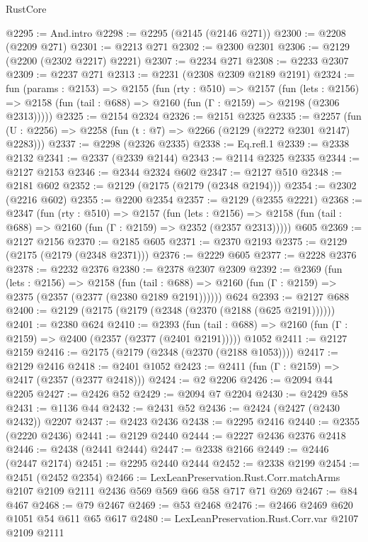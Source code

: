 \begin{lexlean}{RustCore}
\begin{coremodule}
@2295 := And.intro
@2298 := @2295 (@2145 (@2146 @271))
@2300 := @2208 (@2209 @271)
@2301 := @2213 @271
@2302 := @2300 @2301
@2306 := @2129 (@2200 (@2302 @2217) @2221)
@2307 := @2234 @271
@2308 := @2233 @2307
@2309 := @2237 @271
@2313 := @2231 (@2308 @2309 @2189 @2191)
@2324 := fun (params : @2153) =>
  @2155
    (fun (rty : @510) =>
    @2157
      (fun (lets : @2156) =>
      @2158 (fun (tail : @688) => @2160 (fun (Γ : @2159) => @2198 (@2306 @2313)))))
@2325 := @2154 @2324
@2326 := @2151 @2325
@2335 := @2257 (fun (U : @2256) => @2258 (fun (t : @7) => @2266 (@2129 (@2272 @2301 @2147) @2283)))
@2337 := @2298 (@2326 @2335)
@2338 := Eq.refl.{1}
@2339 := @2338 @2132
@2341 := @2337 (@2339 @2144)
@2343 := @2114 @2325 @2335
@2344 := @2127 @2153
@2346 := @2344 @2324 @602
@2347 := @2127 @510
@2348 := @2181 @602
@2352 := @2129 (@2175 (@2179 (@2348 @2194)))
@2354 := @2302 (@2216 @602)
@2355 := @2200 @2354
@2357 := @2129 (@2355 @2221)
@2368 := @2347
    (fun (rty : @510) =>
    @2157
      (fun (lets : @2156) =>
      @2158 (fun (tail : @688) => @2160 (fun (Γ : @2159) => @2352 (@2357 @2313)))))
    @605
@2369 := @2127 @2156
@2370 := @2185 @605
@2371 := @2370 @2193
@2375 := @2129 (@2175 (@2179 (@2348 @2371)))
@2376 := @2229 @605
@2377 := @2228 @2376
@2378 := @2232 @2376
@2380 := @2378 @2307 @2309
@2392 := @2369
    (fun (lets : @2156) =>
    @2158
      (fun (tail : @688) => @2160 (fun (Γ : @2159) => @2375 (@2357 (@2377 (@2380 @2189 @2191))))))
    @624
@2393 := @2127 @688
@2400 := @2129 (@2175 (@2179 (@2348 (@2370 (@2188 (@625 @2191))))))
@2401 := @2380 @624
@2410 := @2393
    (fun (tail : @688) => @2160 (fun (Γ : @2159) => @2400 (@2357 (@2377 (@2401 @2191)))))
    @1052
@2411 := @2127 @2159
@2416 := @2175 (@2179 (@2348 (@2370 (@2188 @1053))))
@2417 := @2129 @2416
@2418 := @2401 @1052
@2423 := @2411 (fun (Γ : @2159) => @2417 (@2357 (@2377 @2418)))
@2424 := @2 @2206
@2426 := @2094 @44 @2205
@2427 := @2426 @52
@2429 := @2094 @7 @2204
@2430 := @2429 @58
@2431 := @1136 @44
@2432 := @2431 @52
@2436 := @2424 (@2427 (@2430 @2432)) @2207
@2437 := @2423 @2436
@2438 := @2295 @2416
@2440 := @2355 (@2220 @2436)
@2441 := @2129 @2440
@2444 := @2227 @2436 @2376 @2418
@2446 := @2438 (@2441 @2444)
@2447 := @2338 @2166
@2449 := @2446 (@2447 @2174)
@2451 := @2295 @2440 @2444
@2452 := @2338 @2199
@2454 := @2451 (@2452 @2354)
@2466 := LexLeanPreservation.Rust.Corr.matchArms
    @2107
    @2109
    @2111
    @2436
    @569
    @569
    @66
    @58
    @717
    @71
    @269
@2467 := @84 @467
@2468 := @79 @2467
@2469 := @53 @2468
@2476 := @2466 @2469 @620 @1051 @54 @611 @65 @617
@2480 := LexLeanPreservation.Rust.Corr.var @2107 @2109 @2111

\end{coremodule}
\end{lexlean}
